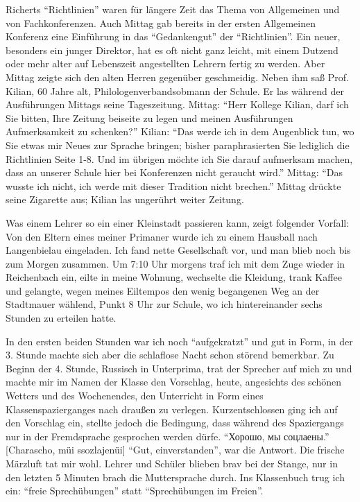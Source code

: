 Richerts \enquote{Richtlinien} waren für längere Zeit das Thema von Allgemeinen und von Fachkonferenzen. Auch Mittag gab bereits in der ersten Allgemeinen Konferenz eine Einführung in das \enquote{Gedankengut} der \enquote{Richtlinien}. Ein neuer, besonders ein junger Direktor, hat es oft nicht ganz leicht, mit einem Dutzend oder mehr alter auf Lebenszeit angestellten Lehrern fertig zu werden. Aber Mittag zeigte sich den alten Herren gegenüber geschmeidig. Neben ihm saß Prof. Kilian, 60 Jahre alt, Philologenverbandsobmann der Schule. Er las während der Ausführungen Mittags seine Tageszeitung. Mittag: \enquote{Herr Kollege Kilian, darf ich Sie bitten, Ihre Zeitung beiseite zu legen und meinen Ausführungen Aufmerksamkeit zu schenken?} Kilian: \enquote{Das werde ich in dem Augenblick tun, wo Sie etwas mir Neues zur Sprache bringen; bisher paraphrasierten Sie lediglich die Richtlinien Seite 1-8. Und im übrigen möchte ich Sie darauf aufmerksam machen, dass an unserer Schule hier bei Konferenzen nicht geraucht wird.} Mittag: \enquote{Das wusste ich nicht, ich werde mit dieser Tradition nicht brechen.} Mittag drückte seine Zigarette aus; Kilian las ungerührt weiter Zeitung.

Was einem Lehrer so ein einer Kleinstadt passieren kann, zeigt folgender Vorfall: Von den Eltern eines meiner Primaner wurde ich zu einem Hausball nach Langenbielau eingeladen. Ich fand nette Gesellschaft vor, und man blieb noch bis zum Morgen zusammen. Um 7:10 Uhr morgens traf ich mit dem Zuge wieder in Reichenbach ein, eilte in meine Wohnung, wechselte die Kleidung, trank Kaffee und gelangte, wegen meines Eiltempos den wenig begangenen Weg an der Stadtmauer wählend, Punkt 8 Uhr zur Schule, wo ich hintereinander sechs Stunden zu erteilen hatte.

In den ersten beiden Stunden war ich noch \enquote{aufgekratzt} und gut in Form, in der 3. Stunde machte sich aber die schlaflose Nacht schon störend bemerkbar. Zu Beginn der 4. Stunde, Russisch in Unterprima, trat der Sprecher auf mich zu und machte mir im Namen der Klasse den Vorschlag, heute, angesichts des schönen Wetters und des Wochenendes, den Unterricht in Form eines Klassenspazierganges nach draußen zu verlegen. Kurzentschlossen ging ich auf den Vorschlag ein, stellte jedoch die Bedingung, dass während des Spaziergangs nur in der Fremdsprache gesprochen werden dürfe. \enquote{Хорошо, мы соцлаены.} [Charascho, müi ssozlajenüi] \enquote{Gut, einverstanden}, war die Antwort. Die frische Märzluft tat mir wohl. Lehrer und Schüler blieben brav bei der Stange, nur in den letzten 5 Minuten brach die Muttersprache durch. Ins Klassenbuch trug ich ein: \enquote{freie Sprechübungen} statt \enquote{Sprechübungen im Freien}.

